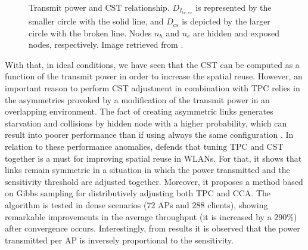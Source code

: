 \documentclass[12pt, a4paper,twoside]{tesi_upf}
\begin{document}
			\begin{figure}[h!]
				\centering
				\caption{Transmit power and CST relationship. $D_{I_{tx,rx}}$ is represented by the smaller circle with the solid line, and $D_{cs}$ is depicted by the larger circle with the broken line. Nodes $n_h$ and $n_e$ are hidden and exposed nodes, respectively. Image retrieved from \cite{thorpe2014survey}.}
				\label{fig:tx_cca_relation}
			\end{figure}	
		
			With that, in ideal conditions, we have seen that the CST can be computed as a function of the transmit power in order to increase the spatial reuse. However, an important reason to perform CST adjustment in combination with TPC relies in the asymmetries provoked by a modification of the transmit power in an overlapping environment. The fact of creating asymmetric links generates starvation and collisions by hidden node with a higher probability, which can result into poorer performance than if using always the same configuration \cite{kawadia2005principles}. In relation to these performance anomalies, \cite{mhatre2007interference} defends that tuning TPC and CST together is a must for improving spatial reuse in WLANs. For that, it shows that links remain symmetric in a situation in which the power transmitted and the sensitivity threshold are adjusted together. Moreover, it proposes a method based on Gibbs sampling \cite{bremaud2013markov} for distributively adjusting both TPC and CCA. The algorithm is tested in dense scenarios (72 APs and 288 clients), showing remarkable improvements in the average throughput (it is increased by a $290\%$) after convergence occurs. Interestingly, from results it is observed that the power transmitted per AP is inversely proportional to the sensitivity.				
			
\end{document}
